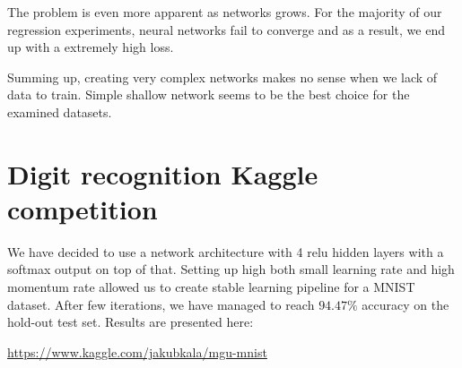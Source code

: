 \documentclass[a4]{article}
\begin{document}
The problem is even more apparent as networks grows. For the majority of our regression experiments, neural networks fail to converge and as a result, we end up with a extremely high loss. 

Summing up, creating very complex networks makes no sense when we lack of data to train. Simple shallow network seems to be the best choice for the examined datasets.

\newpage
\section{Digit recognition Kaggle competition}
We have decided to use a network architecture with 4 relu hidden layers with a softmax output on top of that. Setting up high both small learning rate and high momentum rate allowed us to create stable learning pipeline for a MNIST dataset. After few iterations, we have managed to reach $94.47\%$ accuracy on the hold-out test set.
Results are presented here:\\
\begin{center}
	\href{https://www.kaggle.com/jakubkala/mgu-mnist}{https://www.kaggle.com/jakubkala/mgu-mnist}
\end{center}
\end{document}
